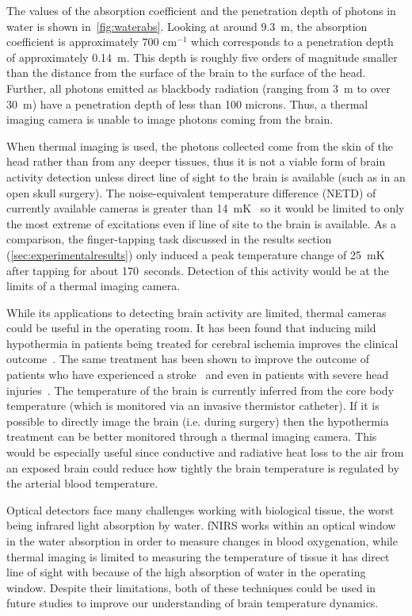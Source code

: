 The values of the absorption coefficient and the penetration depth of photons in water is shown in~\cref{fig:waterabs}. Looking at around 9.3~\textmu m, the absorption coefficient is approximately 700 cm$^{-1}$ which corresponds to a penetration depth of approximately 0.14~\textmu m.  This depth is roughly five orders of magnitude smaller than the distance from the surface of the brain to the surface of the head.  Further, all photons emitted as blackbody radiation (ranging from 3~\textmu m to over 30~\textmu m) have a penetration depth of less than 100 microns.  Thus, a thermal imaging camera is unable to image photons coming from the brain.

When thermal imaging is used, the photons collected come from the skin of the head rather than from any deeper tissues, thus it is not a viable form of brain activity detection unless direct line of sight to the brain is available (such as in an open skull surgery).  The noise-equivalent temperature difference (NETD) of currently available cameras is greater than 14~mK~\citep{flir,ici} so it would be limited to only the most extreme of excitations even if line of site to the brain is available.  As a comparison, the finger-tapping task discussed in the results section (\cref{sec:experimentalresults}) only induced a peak temperature change of 25~mK after tapping for about 170~seconds.  Detection of this activity would be at the limits of a thermal imaging camera.

While its applications to detecting brain activity are limited, thermal cameras could be useful in the operating room.  It has been found that inducing mild hypothermia in patients being treated for cerebral ischemia improves the clinical outcome~\citep{maher1993}. The same treatment has been shown to improve the outcome of patients who have experienced a stroke~\citep{krieger2001} and even in patients with severe head injuries~\citep{soukup2002}. The temperature of the brain is currently inferred from the core body temperature (which is monitored via an invasive thermistor catheter). If it is possible to directly image the brain (i.e. during surgery) then the hypothermia treatment can be better monitored through a thermal imaging camera.  This would be especially useful since conductive and radiative heat loss to the air from an exposed brain could reduce how tightly the brain temperature is regulated by the arterial blood temperature.

Optical detectors face many challenges working with biological tissue, the worst being infrared light absorption by water. fNIRS works within an optical window in the water absorption in order to measure changes in blood oxygenation, while thermal imaging is limited to measuring the temperature of tissue it has direct line of sight with because of the high absorption of water in the operating window. Despite their limitations, both of these techniques could be used in future studies to improve our understanding of brain temperature dynamics.

